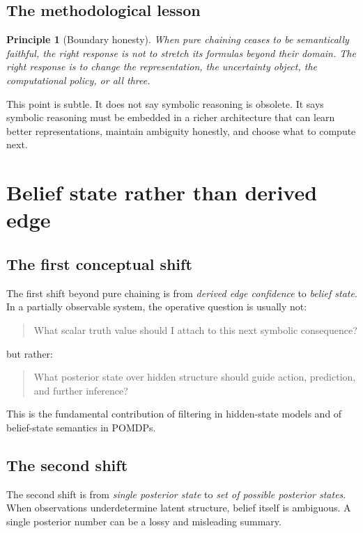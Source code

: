 \documentclass[11pt]{article}
\newtheorem{principle}{Principle}
\begin{document}
\subsection{The methodological lesson}

\begin{principle}[Boundary honesty]
When pure chaining ceases to be semantically faithful, the right response is not
to stretch its formulas beyond their domain.  The right response is to change
the representation, the uncertainty object, the computational policy, or all
three.
\end{principle}

This point is subtle.  It does not say symbolic reasoning is obsolete.  It says
symbolic reasoning must be embedded in a richer architecture that can learn
better representations, maintain ambiguity honestly, and choose what to compute
next.

\section{Belief state rather than derived edge}

\subsection{The first conceptual shift}

The first shift beyond pure chaining is from \emph{derived edge confidence} to
\emph{belief state}.  In a partially observable system, the operative question
is usually not:
\begin{quote}
What scalar truth value should I attach to this next symbolic consequence?
\end{quote}
but rather:
\begin{quote}
What posterior state over hidden structure should guide action, prediction, and
further inference?
\end{quote}

This is the fundamental contribution of filtering in hidden-state models and of
belief-state semantics in POMDPs.

\subsection{The second shift}

The second shift is from \emph{single posterior state} to \emph{set of possible
posterior states}.  When observations underdetermine latent structure, belief
itself is ambiguous.  A single posterior number can be a lossy and misleading
summary.
\end{document}
